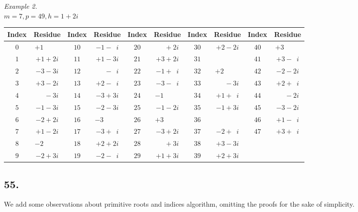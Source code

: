 \documentclass[twoside,12pt, showframe]{memoir}
\begin{document}
\begin{center}
\textit{Example 2.}\\
\(m=7, p=49, h=1+2 i\)\\
\begin{tabular}{c|c||c|c||c|c||c|c||c|c}
Index & Residue & Index & Residue & Index & Residue & Index & Residue & Index & Residue \\
\hline
\(0\) & \(+1\phantom{\;+0i}\) & \(10\) & \(-1-\phantom{1}i\) & \(20\) & \(\phantom{+0}+2 i\) & \(30\) & \(+2-2 i\) & \(40\) & \(+3\phantom{\;+0i} \)\\[-4pt]
\(1\) & \(+1+2 i\) & \(11\) & \(+1-3 i\) & \(21\) & \(+3+2 i\) & \(31\) & \(\) & \(41\) & \(+3-\phantom{1}i \)\\[-4pt]
\(2\) & \(-3-3 i\) & \(12\) & \(\phantom{+0}-\phantom{1}i\) & \(22\) & \(-1+\phantom{1}i\) & \(32\) & \(+2\phantom{\;+0i}\) & \(42\) & \(-2-2 i \)\\[-4pt]
\(3\) & \(+3-2 i\) & \(13\) & \(+2-\phantom{1}i\) & \(23\) & \(-3-\phantom{1}i\) & \(33\) & \(\phantom{+0}-3 i\) & \(43\) & \(+2+\phantom{1}i \)\\[-4pt]
\(4\) & \(\phantom{+0}-3 i\) & \(14\) & \(-3+3 i\) & \(24\) & \(-1\phantom{\;+0i}\) & \(34\) & \(+1+\phantom{1}i\) & \(44\) & \(\phantom{+0}-2 i \)\\[-4pt]
\(5\) & \(-1-3 i\) & \(15\) & \(-2-3 i\) & \(25\) & \(-1-2 i\) & \(35\) & \(-1+3 i\) & \(45\) & \(-3-2 i \)\\[-4pt]
\(6\) & \(-2+2i\) & \(16\) & \(-3\phantom{\;+0i}\) & \(26\) & \(+3\phantom{\;+0i}\) & \(36\) & \(\) & \(46\) & \(+1-\phantom{1}i \)\\[-4pt]
\(7\) & \(+1-2 i\) & \(17\) & \(-3+\phantom{1}i\) & \(27\) & \(-3+2 i\) & \(37\) & \(-2+\phantom{1}i\) & \(47\) & \(+3+\phantom{1}i \)\\[-4pt]
\(8\) & \(-2\phantom{\;+0i}\) & \(18\) & \(+2+2 i\) & \(28\) & \(\phantom{+0}+3 i\) & \(38\) & \(+3-3 i\) & \multicolumn{2}{c}{}\\[-4pt]
\(9\) & \(-2+3 i\) & \(19\) & \(-2-\phantom{1}i\) & \(29\) & \(+1+3 i\) & \(39\) & \(+2+3 i\) & \multicolumn{2}{c}{}
\end{tabular}
\end{center}
%

\subsection*{55.}

We add some observations about primitive roots and indices algorithm, omitting the proofs for the sake of simplicity.
\end{document}
